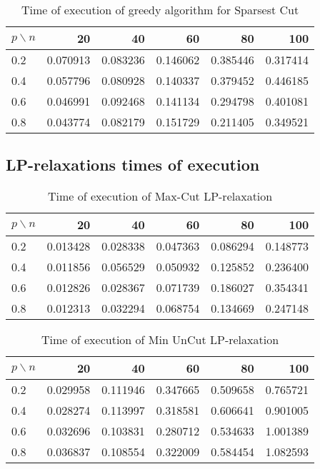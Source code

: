\documentclass[12pt]{article}
\begin{document}
\begin{table}[H]
	\centering
	\begin{tabular}{|lrrrrr|}
		\toprule
		{$p \backslash n$} &       20  &       40  &       60  &       80  &       100 \\
		\midrule
		0.2 &  0.070913 &  0.083236 &  0.146062 &  0.385446 &  0.317414 \\
		0.4 &  0.057796 &  0.080928 &  0.140337 &  0.379452 &  0.446185 \\
		0.6 &  0.046991 &  0.092468 &  0.141134 &  0.294798 &  0.401081 \\
		0.8 &  0.043774 &  0.082179 &  0.151729 &  0.211405 &  0.349521 \\
		\bottomrule
	\end{tabular}
	\caption{Time of execution of greedy algorithm for Sparsest Cut}
\end{table}

\subsection{LP-relaxations times of execution}

\begin{table}[H]
	\centering
	\begin{tabular}{|lrrrrr|}
		\toprule
		{$p \backslash n$} &       20  &       40  &       60  &       80  &       100 \\
		\midrule
		0.2 &  0.013428 &  0.028338 &  0.047363 &  0.086294 &  0.148773 \\
		0.4 &  0.011856 &  0.056529 &  0.050932 &  0.125852 &  0.236400 \\
		0.6 &  0.012826 &  0.028367 &  0.071739 &  0.186027 &  0.354341 \\
		0.8 &  0.012313 &  0.032294 &  0.068754 &  0.134669 &  0.247148 \\
		\bottomrule
	\end{tabular}
	\caption{Time of execution of Max-Cut LP-relaxation}
\end{table}

\begin{table}[H]
	\centering
	\begin{tabular}{|lrrrrr|}
		\toprule
		{$p \backslash n$} &       20  &       40  &       60  &       80  &       100 \\
		\midrule
		0.2 &  0.029958 &  0.111946 &  0.347665 &  0.509658 &  0.765721 \\
		0.4 &  0.028274 &  0.113997 &  0.318581 &  0.606641 &  0.901005 \\
		0.6 &  0.032696 &  0.103831 &  0.280712 &  0.534633 &  1.001389 \\
		0.8 &  0.036837 &  0.108554 &  0.322009 &  0.584454 &  1.082593 \\
		\bottomrule
	\end{tabular}
	\caption{Time of execution of Min UnCut LP-relaxation}
\end{table}
\end{document}
